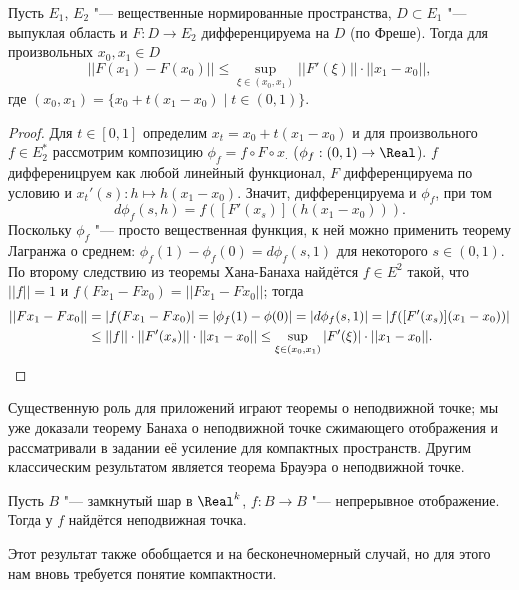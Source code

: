 \documentclass[main]{subfiles}
\begin{document}
\begin{theorem}
  Пусть \( E_1 \), \( E_2 \) "--- вещественные
  нормированные пространства,
  \( D \subset E_1 \) "--- выпуклая область
  и \( F : D \to E_2 \) дифференцируема на \( D \)
  (по Фреше).
  Тогда для произвольных \( x_0, x_1 \in D \)
  \[
    ||F(x_1) - F(x_0)|| \le \sup_{\xi \in (x_0, x_1)} ||F'(\xi)|| \cdot ||x_1 - x_0||,
  \]
  где \( (x_0, x_1) = \{ x_0 + t (x_1 - x_0) \mid t \in (0, 1) \} \).
\end{theorem}
\begin{proof}
  Для \( t \in [0, 1] \) определим
  \( x_t = x_0 + t (x_1 - x_0) \) и
  для произвольного \( f \in E_2^* \)
  рассмотрим композицию
  \( \phi_f = f \circ F \circ x_{\boldsymbol{\cdot}} \)
  (\( \phi_f : (0, 1) \to \Real \)).
  \( f \) дифференицруем как любой линейный функционал,
  \( F \) дифференцируема по условию
  и \( x_t'(s) : h \mapsto h (x_1 - x_0) \).
  Значит, дифференцируема и \( \phi_f \),
  при том
  \[
    d\phi_f(s, h) =
    f([F'(x_s)] (h (x_1 - x_0))).
  \]
  Поскольку \( \phi_f \) "--- просто
  вещественная функция,
  к ней можно применить теорему Лагранжа о среднем:
  \( \phi_f(1) - \phi_f(0) = d \phi_f(s, 1) \)
  для некоторого \( s \in (0, 1) \).
  По второму следствию из теоремы Хана-Банаха
  найдётся \( f \in E^2 \) такой,
  что \( ||f|| = 1 \) и \( f(F x_1 - F x_0) =
  ||F x_1 - F x_0|| \);
  тогда
  \begin{align}
    ||F x_1 - F x_0|| &= |f(F x_1 - F x_0)| =
    |\phi_f(1) - \phi(0)| =
    |d \phi_f (s, 1)| = 
    |f([F'(x_s)](x_1 - x_0))| \\ 
    &\le ||f|| \cdot ||F'(x_s)|| \cdot ||x_1 - x_0|| \le
    \sup_{\xi \in (x_0, x_1)} |F'(\xi)| \cdot ||x_1 - x_0||.
    \qedhere
  \end{align}
\end{proof}

Существенную роль для приложений играют
теоремы о неподвижной точке;
мы уже доказали теорему Банаха о
неподвижной точке сжимающего отображения
и рассматривали в задании
её усиление для компактных пространств.
Другим классическим результатом
является теорема Брауэра о неподвижной точке.

\begin{theorem*}[Брауэр, 1910]
  Пусть \( B \) "--- замкнутый шар в \( \Real^k \),
  \( f : B \to B \) "--- непрерывное отображение.
  Тогда у \( f \) найдётся неподвижная точка.
\end{theorem*}

Этот результат также обобщается
и на бесконечномерный случай,
но для этого нам вновь требуется
понятие компактности.
\end{document}
